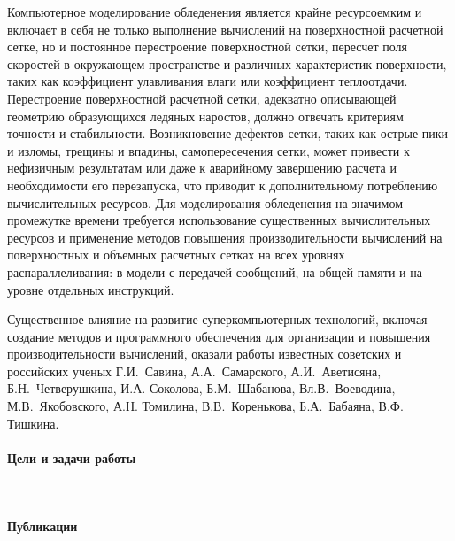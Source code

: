 Компьютерное моделирование обледенения является крайне ресурсоемким и включает в себя не только выполнение вычислений на поверхностной расчетной сетке, но и постоянное перестроение поверхностной сетки, пересчет поля скоростей в окружающем пространстве и различных характеристик поверхности, таких как коэффициент улавливания влаги или коэффициент теплоотдачи.
Перестроение поверхностной расчетной сетки, адекватно описывающей геометрию образующихся ледяных наростов, должно отвечать критериям точности и стабильности.
Возникновение дефектов сетки, таких как острые пики и изломы, трещины и впадины, самопересечения сетки, может привести к нефизичным результатам или даже к аварийному завершению расчета и необходимости его перезапуска, что приводит к дополнительному потреблению вычислительных ресурсов. 
Для моделирования обледенения на значимом промежутке времени требуется использование существенных вычислительных ресурсов и применение методов повышения производительности вычислений на поверхностных и объемных расчетных сетках на всех уровнях распараллеливания: в модели с передачей сообщений, на общей памяти и на уровне отдельных инструкций.

Существенное влияние на развитие суперкомпьютерных технологий, включая создание методов и программного обеспечения для организации и повышения производительности вычислений, оказали работы известных советских и российских ученых Г.И.~Савина, А.А.~Самарского, А.И.~Аветисяна, Б.Н.~Четверушкина, И.А. Соколова, Б.М.~Шабанова, Вл.В.~Воеводина, М.В.~Якобовского, А.Н. Томилина, В.В.~Коренькова, Б.А.~Бабаяна, В.Ф. Тишкина. 

\paragraph{Цели и задачи работы} \



















%

\paragraph{Публикации} \

